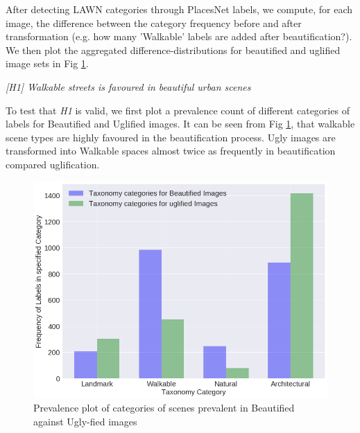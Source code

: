 After detecting LAWN categories through PlacesNet labels,  we compute, for each image, the difference between the category frequency before and after transformation (e.g. how many 'Walkable' labels are added after beautification?). We then plot the aggregated difference-distributions for beautified and uglified image sets in Fig \ref{fig:taxonomyCount}.%
\par
\textit{[H1] Walkable streets is favoured in beautiful urban scenes}
\par
To test that \textit{H1} is valid, we first plot a prevalence count of different categories of labels for Beautified and Uglified images. %
It can be seen from Fig \ref{fig:taxonomyCount}, that walkable scene types are highly favoured in the beautification process. Ugly images are transformed into Walkable spaces almost twice as frequently in beautification compared uglification.
\begin{figure}[h]
	\centering
	\includegraphics[width=\columnwidth]{Plot/taxonomyCount.png}
	\caption{Prevalence plot of categories of scenes prevalent in Beautified against Ugly-fied images}
	\label{fig:taxonomyCount}
\end{figure}

